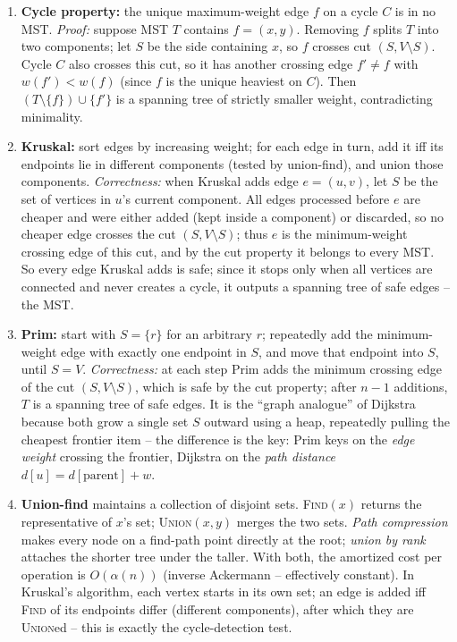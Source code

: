 \documentclass[11pt]{article}
\begin{document}
\begin{enumerate}[label=\textbf{A\arabic*.}, leftmargin=2.2em]
\item \textbf{Cycle property:} the unique maximum-weight edge $f$ on a cycle $C$
is in no MST. \textit{Proof:} suppose MST $T$ contains $f=(x,y)$. Removing $f$
splits $T$ into two components; let $S$ be the side containing $x$, so $f$
crosses cut $(S,V\setminus S)$. Cycle $C$ also crosses this cut, so it has
another crossing edge $f'\ne f$ with $w(f')<w(f)$ (since $f$ is the unique
heaviest on $C$). Then $(T\setminus\{f\})\cup\{f'\}$ is a spanning tree of
strictly smaller weight, contradicting minimality.

\item \textbf{Kruskal:} sort edges by increasing weight; for each edge in turn,
add it iff its endpoints lie in different components (tested by union-find), and
union those components. \textit{Correctness:} when Kruskal adds edge $e=(u,v)$,
let $S$ be the set of vertices in $u$'s current component. All edges processed
before $e$ are cheaper and were either added (kept inside a component) or
discarded, so no cheaper edge crosses the cut $(S,V\setminus S)$; thus $e$ is the
minimum-weight crossing edge of this cut, and by the cut property it belongs to
every MST. So every edge Kruskal adds is safe; since it stops only when all
vertices are connected and never creates a cycle, it outputs a spanning tree of
safe edges -- the MST.

\item \textbf{Prim:} start with $S=\{r\}$ for an arbitrary $r$; repeatedly add
the minimum-weight edge with exactly one endpoint in $S$, and move that endpoint
into $S$, until $S=V$. \textit{Correctness:} at each step Prim adds the minimum
crossing edge of the cut $(S,V\setminus S)$, which is safe by the cut property;
after $n-1$ additions, $T$ is a spanning tree of safe edges. It is the
``graph analogue'' of Dijkstra because both grow a single set $S$ outward using a
heap, repeatedly pulling the cheapest frontier item -- the difference is the key:
Prim keys on the \emph{edge weight} crossing the frontier, Dijkstra on the
\emph{path distance} $d[u]=d[\text{parent}]+w$.

\item \textbf{Union-find} maintains a collection of disjoint sets. \textsc{Find}$(x)$
returns the representative of $x$'s set; \textsc{Union}$(x,y)$ merges the two
sets. \emph{Path compression} makes every node on a find-path point directly at
the root; \emph{union by rank} attaches the shorter tree under the taller. With
both, the amortized cost per operation is $O(\alpha(n))$ (inverse Ackermann --
effectively constant). In Kruskal's algorithm, each vertex starts in its own set;
an edge is added iff \textsc{Find} of its endpoints differ (different
components), after which they are \textsc{Union}ed -- this is exactly the
cycle-detection test.


\end{enumerate}
\end{document}
